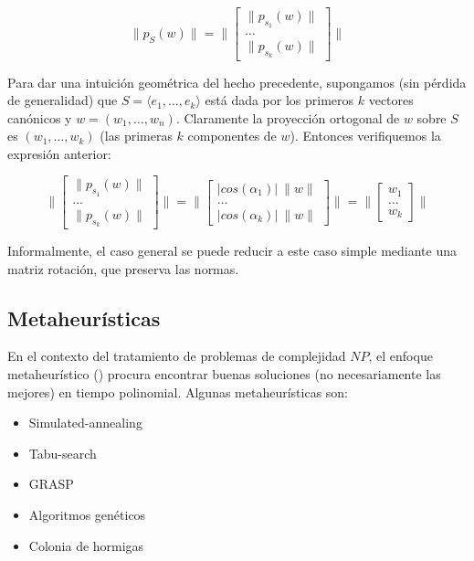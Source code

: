 \documentclass[conference,compsoc,a4paper]{IEEEtran}
\begin{document}
$$
\|p_S(w)\| = \|\begin{bmatrix}
	\|p_{s_1}(w)\| \\
	\dots \\
	\|p_{s_k}(w)\|
\end{bmatrix}\|
$$

\smallskip

Para dar una intuición geométrica del hecho precedente, supongamos (sin 
pérdida de generalidad) que $S = \langle e_1, \dots, e_k\rangle $ está dada por los 
primeros $k$ vectores canónicos y $w = (w_1, \dots, w_n)$. 
Claramente la proyección ortogonal de $w$ sobre $S$ es 
$(w_1, \dots, w_k)$ (las primeras $k$ componentes de $w$). Entonces 
verifiquemos la expresión anterior:

$$
\|\begin{bmatrix}
	\|p_{s_1}(w)\| \\	
	\dots \\
	\|p_{s_k}(w)\|
\end{bmatrix}\| = 
\|\begin{bmatrix}
	|cos(\alpha_1)| \ \|w\| \\
	\dots \\
	|cos(\alpha_k)| \ \|w\|
\end{bmatrix}\| = 
\|\begin{bmatrix}
	w_1 \\
	\dots \\
	w_k
\end{bmatrix}\|
$$

\smallskip

Informalmente, el caso general se puede reducir a este caso simple 
mediante una matriz rotación, que preserva las normas.

\subsection{Metaheurísticas}

En el contexto del tratamiento de problemas de complejidad $NP$, el 
enfoque metaheurístico (\cite{GP:2010,Talbi:2009}) procura encontrar buenas soluciones (no 
necesariamente las mejores) en tiempo polinomial. Algunas 
metaheurísticas son:

\begin{itemize}
	\item Simulated-annealing
	\item Tabu-search
	\item GRASP
	\item Algoritmos genéticos
	\item Colonia de hormigas
\end{itemize}
\end{document}
